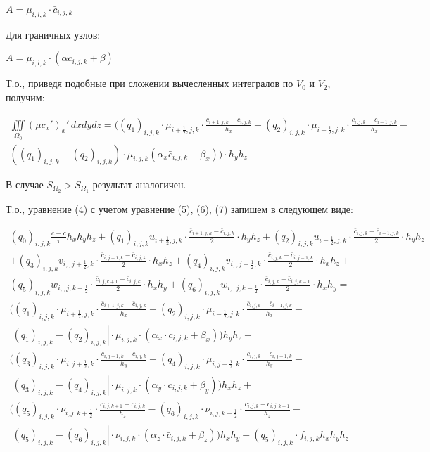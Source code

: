 \documentclass[12pt]{article}
\begin{document}
 $A=\mu_{i,l,k}\cdot\bar{c}_{i,j,k}$

Для граничных узлов:

 $A=\mu_{i,l,k}\cdot( \alpha\bar{c}_{i,j,k}+\beta)$


Т.о., приведя подобные при сложении вычесленных интегралов по $V_0$ и $V_2$, получим:

\begin{multline} 
	\iiint\limits_{\Omega_0} (\mu\bar{c}_x')_x'\,dxdydz =    ((q_1)_{i,j,k}\cdot\mu_{i+\frac{1}{2},j,k}\cdot\frac{\bar{c}_{i+1,j,k}-\bar{c}_{i,j,k}}{h_x} - (q_2)_{i,j,k}\cdot\mu_{i-\frac{1}{2},j,k}\cdot\frac{\bar{c}_{i,j,k}-\bar{c}_{i-1,j,k}}{h_x} -     \\
	((q_1)_{i,j,k}-(q_2)_{i,j,k})\cdot\mu_{i,j,k}(\alpha_x\bar{c}_{i,j,k} + 
	\beta_x) )\cdot h_yh_z   
\end{multline} 

В случае $S_{\Omega_2}>S_{\Omega_1}$ результат аналогичен.

Т.о., уравнение  (4) с учетом уравнение (5), (6), (7) запишем в следующем виде:

\begin{multline} 
	(q_0)_{i,j,k}\frac{\hat{c}-c}{\tau}h_xh_yh_z + (q_1)_{i,j,k}u_{i+\frac{1}{2},j,k} \cdot\frac{\bar{c}_{i+1,j,k}-\bar{c}_{i,j,k}}{2}\cdot h_yh_z + (q_2)_{i,j,k}u_{i-\frac{1}{2},j,k}\cdot\frac{\bar{c}_{i,j,k}-\bar{c}_{i-1,j,k}}{2}\cdot h_yh_z \\
	+ (q_3)_{i,j,k}v_{i,,j+\frac{1}{2},k}\cdot\frac{\bar{c}_{i,j+1,k}-\bar{c}_{i,j,k}}{2}\cdot h_xh_z + 
	(q_4)_{i,j,k}v_{i,,j-\frac{1}{2},k}\cdot\frac{\bar{c}_{i,j,k}-\bar{c}_{i,j-1,k}}{2}\cdot h_xh_z + \\
	(q_5)_{i,j,k}w_{i,,j,k+\frac{1}{2}}\cdot\frac{\bar{c}_{i,j,k+1}-\bar{c}_{i,j,k}}{2}\cdot h_xh_y + 
	(q_6)_{i,j,k}w_{i,,j,k-\frac{1}{2}}\cdot\frac{\bar{c}_{i,j,k}-\bar{c}_{i,j,k-1}}{2}\cdot h_xh_y = \\
	((q_1)_{i,j,k}\cdot\mu_{i+\frac{1}{2},j,k}\cdot \frac{\bar{c}_{i+1,j,k}-\bar{c}_{i,j,k}}{h_x} -  (q_2)_{i,j,k}\cdot\mu_{i-\frac{1}{2},j,k}\cdot \frac{\bar{c}_{i,j,k}-\bar{c}_{i-1,j,k}}{h_x} - \\
	 |(q_1)_{i,j,k}-(q_2)_{i,j,k}|\cdot\mu_{i,j,k}\cdot(\alpha_x\cdot\bar{c}_{i,j,k}+\beta_x))h_yh_z + \\
	 ((q_3)_{i,j,k}\cdot\mu_{i,j+\frac{1}{2},k}\cdot \frac{\bar{c}_{i,j+1,k}-\bar{c}_{i,j,k}}{h_y} -  (q_4)_{i,j,k}\cdot\mu_{i,j-\frac{1}{2},k}\cdot \frac{\bar{c}_{i,j,k}-\bar{c}_{i,j-1,k}}{h_y} - \\
	 |(q_3)_{i,j,k}-(q_4)_{i,j,k}|\cdot\mu_{i,j,k}\cdot(\alpha_y\cdot\bar{c}_{i,j,k}+\beta_y))h_xh_z + \\
	 ((q_5)_{i,j,k}\cdot\nu_{i,j,k+\frac{1}{2}}\cdot \frac{\bar{c}_{i,j,k+1}-\bar{c}_{i,j,k}}{h_z} -  (q_6)_{i,j,k}\cdot\nu_{i,j,k-\frac{1}{2}}\cdot \frac{\bar{c}_{i,j,k}-\bar{c}_{i,j,k-1}}{h_z} - \\
	 |(q_5)_{i,j,k}-(q_6)_{i,j,k}|\cdot\nu_{i,j,k}\cdot(\alpha_z\cdot\bar{c}_{i,j,k}+\beta_z))h_xh_y + (q_5)_{i,j,k}\cdot f_{i,j,k}h_xh_yh_z
\end{multline} 
\end{document}
